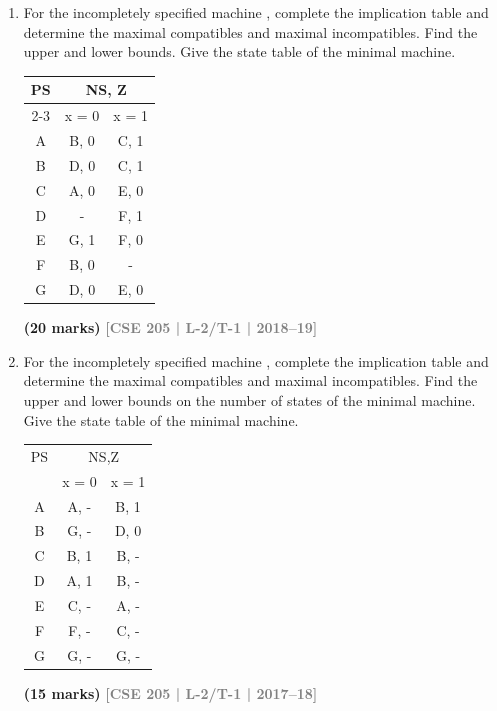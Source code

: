 \documentclass[12pt]{article}
\newcommand{\yr}[1]{\hfill\textcolor{gray}{\small\textbf{[#1]}}}
\newcommand{\mk}[1]{\textcolor{orange!70!black}{\small\textbf{(#1 marks)}}}
\begin{document}
\begin{enumerate}
\mk{25} \yr{CSE 205 | L-2/T-1 | 2019--20}

\item For the incompletely specified machine , complete the implication table and determine the maximal compatibles and maximal incompatibles. Find the upper and lower bounds. Give the state table of the minimal machine.

\begin{center}
  \begin{tabular}{|c|c|c|}
\hline
\multirow{2}{*}{PS} & \multicolumn{2}{c|}{NS, Z} \\ \cline{2-3} 
 & x = 0 & x = 1 \\ \hline
A & B, 0 & C, 1 \\ \hline
B & D, 0 & C, 1 \\ \hline
C & A, 0 & E, 0 \\ \hline
D & - & F, 1 \\ \hline
E & G, 1 & F, 0 \\ \hline
F & B, 0 & - \\ \hline
G & D, 0 & E, 0 \\ \hline
\end{tabular}
\end{center}

\mk{20} \yr{CSE 205 | L-2/T-1 | 2018--19}

\item For the incompletely specified machine , complete the implication table and determine the maximal compatibles and maximal incompatibles. Find the upper and lower bounds on the number of states of the minimal machine. Give the state table of the minimal machine.
\begin{center}
  \begin{tabular}{c|cc}
PS & \multicolumn{2}{c}{NS,Z} \\
 & x = 0 & x = 1 \\
\hline
A & A, - & B, 1 \\
B & G, - & D, 0 \\
C & B, 1 & B, - \\
D & A, 1 & B, - \\
E & C, - & A, - \\
F & F, - & C, - \\
G & G, - & G, - \\
\end{tabular}
\end{center}
  
\mk{15} \yr{CSE 205 | L-2/T-1 | 2017--18}

\end{enumerate}
\end{document}
